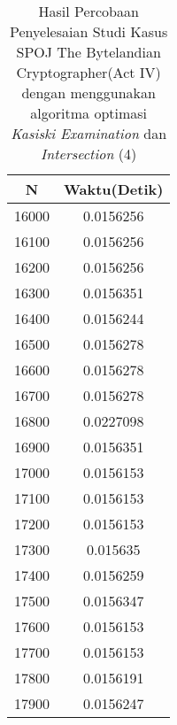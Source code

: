 \begin{table}[H]
\centering
\caption {Hasil Percobaan Penyelesaian Studi Kasus SPOJ The Bytelandian Cryptographer(Act IV) dengan menggunakan algoritma optimasi \textit{Kasiski Examination} dan \textit{Intersection} (4)}
\begin{tabular}{|c|c|}\hline
N&Waktu(Detik)\\ \hline
16000&0.0156256\\ \hline
16100&0.0156256\\ \hline
16200&0.0156256\\ \hline
16300&0.0156351\\ \hline
16400&0.0156244\\ \hline
16500&0.0156278\\ \hline
16600&0.0156278\\ \hline
16700&0.0156278\\ \hline
16800&0.0227098\\ \hline
16900&0.0156351\\ \hline
17000&0.0156153\\ \hline
17100&0.0156153\\ \hline
17200&0.0156153\\ \hline
17300&0.015635\\ \hline
17400&0.0156259\\ \hline
17500&0.0156347\\ \hline
17600&0.0156153\\ \hline
17700&0.0156153\\ \hline
17800&0.0156191\\ \hline
17900&0.0156247\\ \hline
\end{tabular}
\label{tab:1res9}
\end{table}
